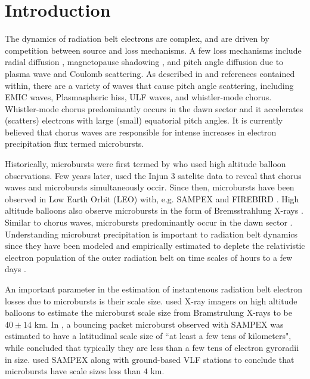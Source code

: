 \documentclass[draft,linenumbers]{agujournal}
\begin{document}
\section{Introduction}\label{Intro}
The dynamics of radiation belt electrons are complex, and are driven by competition between source and loss mechanisms. A few loss mechanisms include radial diffusion \citep{Shprits04}, magnetopause shadowing \citep{Ukhorskiy06}, and pitch angle diffusion \citep{Selesnick03, Abel1998_1} due to plasma wave and Coulomb scattering. As described in \citep{Millan07, Thorne10} and references contained within, there are a variety of waves that cause pitch angle scattering, including EMIC waves, Plasmaspheric hiss, ULF waves, and whistler-mode chorus. Whistler-mode chorus predominantly occurs in the dawn sector \citep{Li09} and it accelerates (scatters) electrons with large (small) equatorial pitch angles\citep{Horne03}. It is currently believed that chorus waves are responsible for intense increases in electron precipitation flux termed microbursts. 

Historically, microbursts were first termed by \citet{Anderson1964} who used high altitude balloon observations. Few years later, \citet{Oliven1968} used the Injun 3 satelite data to reveal that chorus waves and microbursts simultaneously occir. Since then, microbursts have been observed in Low Earth Orbit (LEO) with, e.g. SAMPEX \citep{Nakamura95, Nakamura00, Blake96, Lorentzen01a, Lorentzen01b, O'Brien03, O'Brien04, Blum15} and FIREBIRD \citep{Crew16}. High altitude balloons also observe microbursts in the form of Bremsstrahlung X-rays \citep{Parks1967, Woodger15, Anderson2017}. Similar to chorus waves, microbursts predominantly occur in the dawn sector \citep{Lorentzen01b}. Understanding microburst precipitation is important to radiation belt dynamics since they have been modeled and empirically estimated to deplete the relativistic electron population of the outer radiation belt on time scales of hours to a few days \citep{O'Brien04, Thorne05, Shprits07}. 

An important parameter in the estimation of instantenous radiation belt electron losses due to microbursts is their scale size. \citet{Parks1967} used X-ray imagers on high altitude balloons to estimate the microburst scale size from Bramstrulung X-rays to be $40 \pm 14$ km. In \citet{Blake96}, a bouncing packet microburst observed with SAMPEX was estimated to have a latitudinal scale size of ``at least a few tens of kilometers", while \citet{Blake96} concluded that typically they are less than a few tens of electron gyroradii in size. \citet{Dietrich10} used SAMPEX along with ground-based VLF stations to conclude that microbursts have scale sizes less than $4$ km.
\end{document}
